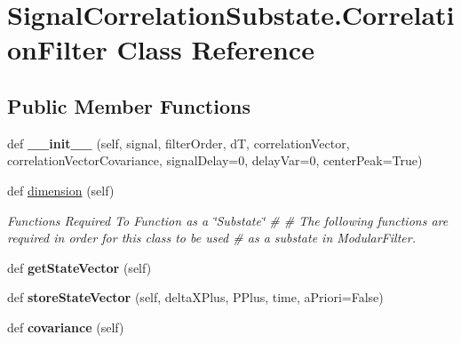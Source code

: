 \hypertarget{classSignalCorrelationSubstate_1_1CorrelationFilter}{}\section{Signal\+Correlation\+Substate.\+Correlation\+Filter Class Reference}
\label{classSignalCorrelationSubstate_1_1CorrelationFilter}
\subsection*{Public Member Functions}
\begin{DoxyCompactItemize}
\item 
def {\bfseries \+\_\+\+\_\+init\+\_\+\+\_\+} (self, signal, filter\+Order, dT, correlation\+Vector, correlation\+Vector\+Covariance, signal\+Delay=0, delay\+Var=0, center\+Peak=True)\hypertarget{classSignalCorrelationSubstate_1_1CorrelationFilter_a824dfd77c5bb3cdafac7436147fe28fe}{}\label{classSignalCorrelationSubstate_1_1CorrelationFilter_a824dfd77c5bb3cdafac7436147fe28fe}

\item 
def \hyperlink{classSignalCorrelationSubstate_1_1CorrelationFilter_a6f498c6905d1c8aab4efef99a98b353e}{dimension} (self)
\begin{DoxyCompactList}\small\item\em Functions Required To Function as a \char`\"{}\+Substate\char`\"{} \# \# The following functions are required in order for this class to be used \# as a substate in Modular\+Filter. \end{DoxyCompactList}\item 
def {\bfseries get\+State\+Vector} (self)\hypertarget{classSignalCorrelationSubstate_1_1CorrelationFilter_ad5a7ad0c1796ca7ba7e0f25d4e553478}{}\label{classSignalCorrelationSubstate_1_1CorrelationFilter_ad5a7ad0c1796ca7ba7e0f25d4e553478}

\item 
def {\bfseries store\+State\+Vector} (self, delta\+X\+Plus, P\+Plus, time, a\+Priori=False)\hypertarget{classSignalCorrelationSubstate_1_1CorrelationFilter_af7eb96af58ba70eefcf85a3529939afe}{}\label{classSignalCorrelationSubstate_1_1CorrelationFilter_af7eb96af58ba70eefcf85a3529939afe}

\item 
def {\bfseries covariance} (self)\hypertarget{classSignalCorrelationSubstate_1_1CorrelationFilter_a134b27eecbbcdab8ebe31ed3e8aaf186}{}\label{classSignalCorrelationSubstate_1_1CorrelationFilter_a134b27eecbbcdab8ebe31ed3e8aaf186}


\end{DoxyCompactItemize}
